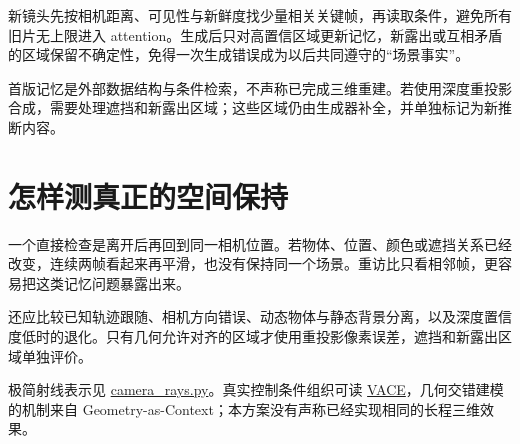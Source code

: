 新镜头先按相机距离、可见性与新鲜度找少量相关关键帧，再读取条件，避免所有旧片无上限进入 attention。生成后只对高置信区域更新记忆，新露出或互相矛盾的区域保留不确定性，免得一次生成错误成为以后共同遵守的“场景事实”。

首版记忆是外部数据结构与条件检索，不声称已完成三维重建。若使用深度重投影合成，需要处理遮挡和新露出区域；这些区域仍由生成器补全，并单独标记为新推断内容。

\section{怎样测真正的空间保持}\label{seedance-m18-ux600eux6837ux6d4bux771fux6b63ux7684ux7a7aux95f4ux4fddux6301}

一个直接检查是离开后再回到同一相机位置。若物体、位置、颜色或遮挡关系已经改变，连续两帧看起来再平滑，也没有保持同一个场景。重访比只看相邻帧，更容易把这类记忆问题暴露出来。

还应比较已知轨迹跟随、相机方向错误、动态物体与静态背景分离，以及深度置信度低时的退化。只有几何允许对齐的区域才使用重投影像素误差，遮挡和新露出区域单独评价。

极简射线表示见 \hyperref[code-camera-rays]{camera\_rays.py}。真实控制条件组织可读 \href{https://github.com/ali-vilab/VACE}{VACE}，几何交错建模的机制来自 Geometry-as-Context；本方案没有声称已经实现相同的长程三维效果。
